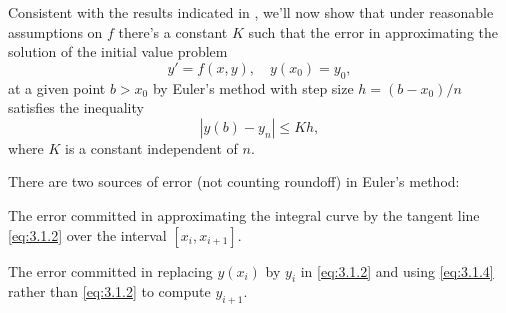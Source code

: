 
Consistent with the results indicated in
, we'll now show that under
reasonable assumptions on $f$ there's a constant $K$ such that
the error in approximating the solution of the initial value problem
\[
y'=f(x,y),\quad y(x_0)=y_0,
\]
at a given point $b>x_0$ by Euler's method with step size
$h=(b-x_0)/n$ satisfies the inequality
\[
|y(b)-y_n|\le Kh,
\]
where $K$ is a constant independent of $n$.


There are two sources of error (not counting roundoff) in Euler's
method:
\begin{numberlist}
\item %
The error committed in approximating the integral curve by the tangent
line \eqref{eq:3.1.2} over the interval $[x_i,x_{i+1}]$.
\item %
The error committed in replacing $y(x_i)$ by $y_i$ in
\eqref{eq:3.1.2} and using \eqref{eq:3.1.4} rather than \eqref{eq:3.1.2} to
compute $y_{i+1}$.
 \end{numberlist}

